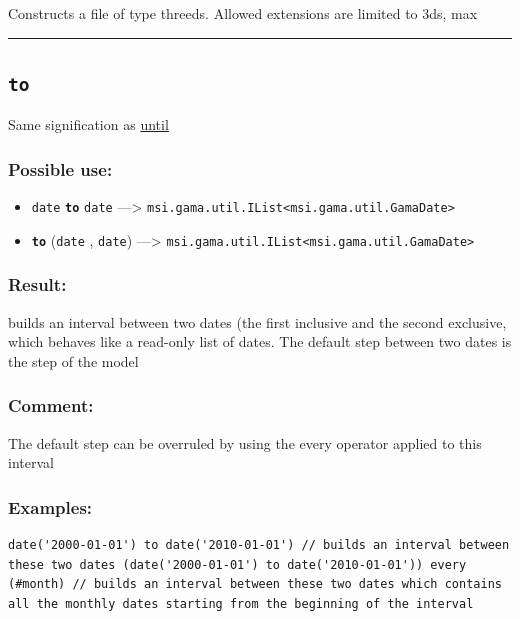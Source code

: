 \documentclass[]{book}
\providecommand{\tightlist}{%
  \setlength{\itemsep}{0pt}\setlength{\parskip}{0pt}}
\theoremstyle{definition}
\theoremstyle{definition}
\theoremstyle{definition}
\theoremstyle{remark}
\begin{document}
Constructs a file of type threeds. Allowed extensions are limited to
3ds, max

\begin{center}\rule{0.5\linewidth}{\linethickness}\end{center}

\subsection{\texorpdfstring{\texttt{to}}{to}}\label{to}

Same signification as \href{operators-s-to-z.html\#until}{until}

\subsubsection{Possible use:}\label{possible-use-519}

\begin{itemize}
\tightlist
\item
  \texttt{date} \textbf{\texttt{to}} \texttt{date} ---\textgreater{}
  \texttt{msi.gama.util.IList\textless{}msi.gama.util.GamaDate\textgreater{}}
\item
  \textbf{\texttt{to}} (\texttt{date} , \texttt{date}) ---\textgreater{}
  \texttt{msi.gama.util.IList\textless{}msi.gama.util.GamaDate\textgreater{}}
\end{itemize}

\subsubsection{Result:}\label{result-502}

builds an interval between two dates (the first inclusive and the second
exclusive, which behaves like a read-only list of dates. The default
step between two dates is the step of the model

\subsubsection{Comment:}\label{comment-99}

The default step can be overruled by using the every operator applied to
this interval

\subsubsection{Examples:}\label{examples-358}

\begin{verbatim}
date('2000-01-01') to date('2010-01-01') // builds an interval between these two dates (date('2000-01-01') to date('2010-01-01')) every (#month) // builds an interval between these two dates which contains all the monthly dates starting from the beginning of the interval 
\end{verbatim}
\end{document}
